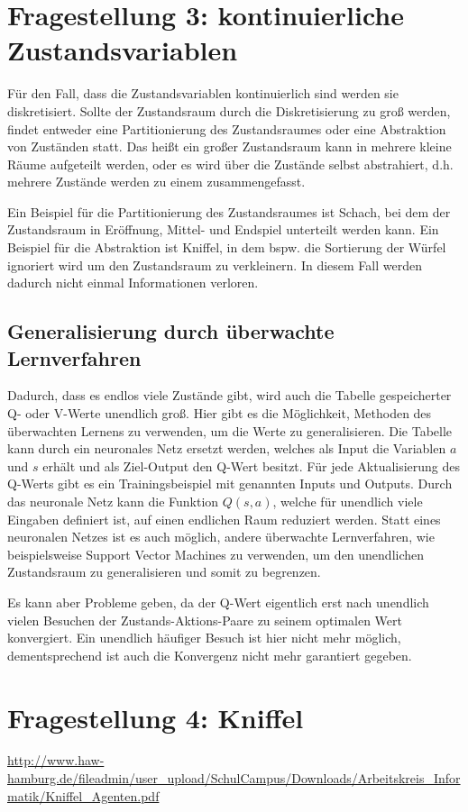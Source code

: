 \documentclass[10pt]{scrartcl}
\begin{document}
\section{Fragestellung 3: kontinuierliche Zustandsvariablen}
Für den Fall, dass die Zustandsvariablen kontinuierlich sind werden sie diskretisiert. Sollte der Zustandsraum durch die Diskretisierung zu groß werden, findet entweder eine Partitionierung des Zustandsraumes oder eine Abstraktion von Zuständen statt. Das heißt ein großer Zustandsraum kann in mehrere kleine Räume aufgeteilt werden, oder es wird über die Zustände selbst abstrahiert, d.h. mehrere Zustände werden zu einem zusammengefasst.

Ein Beispiel für die Partitionierung des Zustandsraumes ist Schach, bei dem der Zustandsraum in Eröffnung, Mittel- und Endspiel unterteilt werden kann. Ein Beispiel für die Abstraktion ist Kniffel, in dem bspw. die Sortierung der Würfel ignoriert wird um den Zustandsraum zu verkleinern. In diesem Fall werden dadurch nicht einmal Informationen verloren.

\subsection{Generalisierung durch überwachte Lernverfahren}

Dadurch, dass es endlos viele Zustände gibt, wird auch die Tabelle gespeicherter Q- oder V-Werte unendlich groß. Hier gibt es die Möglichkeit, Methoden des überwachten Lernens zu verwenden, um die Werte zu generalisieren. Die Tabelle kann durch ein neuronales Netz ersetzt werden, welches als Input die Variablen $a$ und $s$ erhält und als Ziel-Output den Q-Wert besitzt. Für jede Aktualisierung des Q-Werts gibt es ein Trainingsbeispiel mit genannten Inputs und Outputs. Durch das neuronale Netz kann die Funktion $Q(s,a)$, welche für unendlich viele Eingaben definiert ist, auf einen endlichen Raum reduziert werden.
Statt eines neuronalen Netzes ist es auch möglich, andere überwachte Lernverfahren, wie beispielsweise Support Vector Machines zu verwenden, um den unendlichen Zustandsraum zu generalisieren und somit zu begrenzen.

Es kann aber Probleme geben, da der Q-Wert eigentlich erst nach unendlich vielen Besuchen der Zustands-Aktions-Paare zu seinem optimalen Wert konvergiert. Ein unendlich häufiger Besuch ist hier nicht mehr möglich, dementsprechend ist auch die Konvergenz nicht mehr garantiert gegeben.


\section{Fragestellung 4: Kniffel}

\url{http://www.haw-hamburg.de/fileadmin/user_upload/SchulCampus/Downloads/Arbeitskreis_Informatik/Kniffel_Agenten.pdf}
\listoftodos
\end{document}
